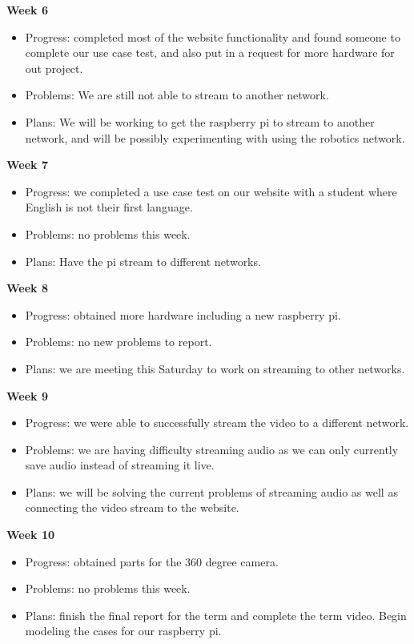 \textbf{Week 6}
\begin{itemize}
    \item Progress: completed most of the website functionality and found someone to complete our use case test, and also put in a request for more hardware for out project.
    \item Problems: We are still not able to stream to another network.
    \item Plans: We will be working to get the raspberry pi to stream to another network, and will be possibly experimenting with using the robotics network.
\end{itemize}
\textbf{Week 7}
\begin{itemize}
    \item Progress: we completed a use case test on our website with a student where English is not their first language.
    \item Problems: no problems this week.
    \item Plans: Have the pi stream to different networks.
\end{itemize}
\textbf{Week 8}
\begin{itemize}
    \item Progress: obtained more hardware including a new raspberry pi.
    \item Problems: no new problems to report.
    \item Plans: we are meeting this Saturday to work on streaming to other networks.
\end{itemize}
\textbf{Week 9}
\begin{itemize}
    \item Progress: we were able to successfully stream the video to a different network.
    \item Problems: we are having difficulty streaming audio as we can only currently save audio instead of streaming it live.
    \item Plans: we will be solving the current problems of streaming audio as well as connecting the video stream to the website.
\end{itemize}
\textbf{Week 10}
\begin{itemize}
    \item Progress: obtained parts for the 360 degree camera.
    \item Problems: no problems this week.
    \item Plans: finish the final report for the term and complete the term video. Begin modeling the cases for our raspberry pi. 
\end{itemize}

